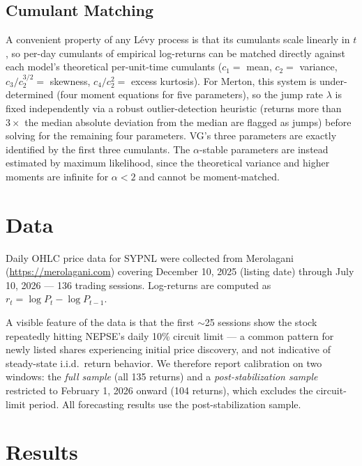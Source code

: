 \documentclass[11pt]{article}
\begin{document}
\subsection{Cumulant Matching}
A convenient property of any Lévy process is that its cumulants scale linearly in $t$, so per-day cumulants of empirical log-returns can be matched directly against each model's theoretical per-unit-time cumulants ($c_1=$ mean, $c_2=$ variance, $c_3/c_2^{3/2}=$ skewness, $c_4/c_2^2=$ excess kurtosis). For Merton, this system is under-determined (four moment equations for five parameters), so the jump rate $\lambda$ is fixed independently via a robust outlier-detection heuristic (returns more than $3\times$ the median absolute deviation from the median are flagged as jumps) before solving for the remaining four parameters. VG's three parameters are exactly identified by the first three cumulants. The $\alpha$-stable parameters are instead estimated by maximum likelihood, since the theoretical variance and higher moments are infinite for $\alpha<2$ and cannot be moment-matched.

\section{Data}
Daily OHLC price data for SYPNL were collected from Merolagani (\url{https://merolagani.com}) covering December 10, 2025 (listing date) through July 10, 2026 — 136 trading sessions. Log-returns are computed as $r_t = \log P_t - \log P_{t-1}$.

A visible feature of the data is that the first $\sim$25 sessions show the stock repeatedly hitting NEPSE's daily 10\% circuit limit — a common pattern for newly listed shares experiencing initial price discovery, and not indicative of steady-state i.i.d.\ return behavior. We therefore report calibration on two windows: the \emph{full sample} (all 135 returns) and a \emph{post-stabilization sample} restricted to February 1, 2026 onward (104 returns), which excludes the circuit-limit period. All forecasting results use the post-stabilization sample.

\section{Results}
\end{document}
